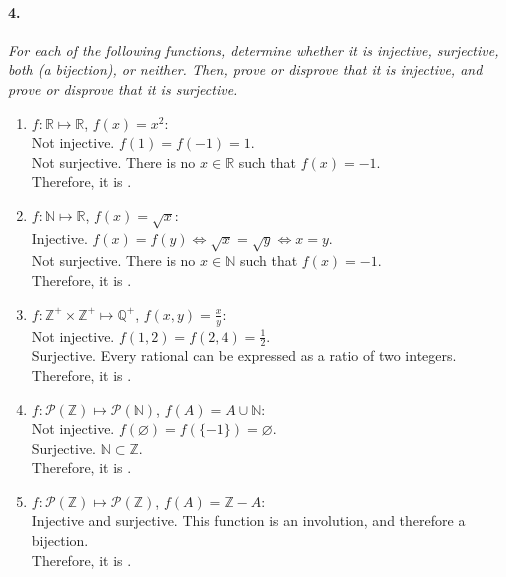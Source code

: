 \documentclass[12pt]{article}
\begin{document}
\paragraph{4.}
{\itshape
    For each of the following functions, determine whether it is injective, surjective, both (a
    bijection), or neither. Then, prove or disprove that it is injective, and prove or disprove
    that it is surjective.
}
\begin{enumerate}[label=\textbf{\alph*.}]
    \item $f : \mathbb{R} \mapsto \mathbb{R}$, $f(x) = x^2$: \\
    Not injective. $f(1) = f(-1) = 1$. \\
    Not surjective. There is no $x \in \mathbb{R}$ such that $f(x) = -1$. \\
    Therefore, it is .
    \item $f : \mathbb{N} \mapsto \mathbb{R}$, $f(x) = \sqrt{x}$: \\
    Injective. $f(x) = f(y) \iff \sqrt{x} = \sqrt{y} \iff x = y$. \\
    Not surjective. There is no $x \in \mathbb{N}$ such that $f(x) = -1$. \\
    Therefore, it is .
    \item $f : \mathbb{Z^+} \times \mathbb{Z^+} \mapsto \mathbb{Q^+}$, $f(x, y) = \frac{x}{y}$: \\
    Not injective. $f(1, 2) = f(2, 4) = \frac{1}{2}$. \\
    Surjective. Every rational can be expressed as a ratio of two integers. \\
    Therefore, it is .
    \item $f : \mathcal{P}(\mathbb{Z}) \mapsto \mathcal{P}(\mathbb{N})$,
    $f(A) = A \cup \mathbb{N}$: \\
    Not injective. $f(\varnothing) = f(\{-1\}) = {\varnothing}$. \\
    Surjective. $\mathbb{N} \subset \mathbb{Z}$. \\
    Therefore, it is .
    \item $f : \mathcal{P}(\mathbb{Z}) \mapsto \mathcal{P}(\mathbb{Z})$,
    $f(A) = \mathbb{Z} - A$: \\
    Injective and surjective. This function is an involution, and therefore a bijection. \\
    Therefore, it is .
\end{enumerate}
\end{document}
